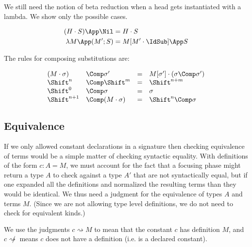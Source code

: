 We still need the notion of beta reduction when a 
head gets instantiated with a lambda.  We show
only the possible cases.

\bigskip 
{}

\begin{align*} 
(H\cdot S)\App\Nil &= H\cdot S\\
\Lam{M}\App(M';S) &= M[M'\cdot\IdSub]\App S
\end{align*} 

The rules for composing substitutions are:

\bigskip 
{}

$$
\begin{array}{llll}
(M\cdot \sigma) & \Comp \sigma' &= &M[\sigma']\cdot (\sigma\Comp\sigma') \\
\Shift^n & \Comp \Shift^m &= &\Shift^{n+m}\\
\Shift^0 & \Comp \sigma &= &\sigma\\
\Shift^{n+1}&\Comp (M\cdot\sigma) &= &\Shift^n\Comp\sigma
\end{array} 
$$


\subsection{Equivalence} 

If we only allowed constant declarations in a signature then checking equivalence
of terms would be a simple matter of checking syntactic equality.  
With definitions of the form $c : A = M$, we must account
for the fact that a focusing phase might return a type $A$ to 
check against a type $A'$ that are not syntactically equal, but
if one expanded all the definitions and normalized the resulting
terms than they would be identical.  We thus need a judgment for the
equivalence of types $A$ and terms $M$.  (Since we are not allowing
type level definitions, we do not need to check for equivalent kinds.)

\newcommand{\StepsTo}{\rightsquigarrow}
\newcommand{\NoStep}{\not\rightsquigarrow}

We use the judgments $c\StepsTo M$  to mean
that the constant $c$ has definition $M$, and $c\NoStep$ means
$c$ does not have a definition (i.e. is a declared constant).

